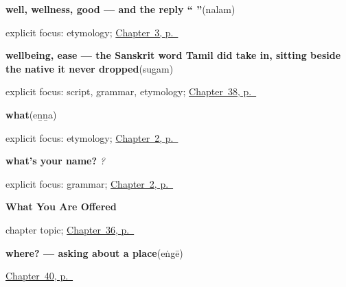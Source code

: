 \noindent\begin{minipage}[t]{\linewidth}
\raggedright
\textbf{well, wellness, good — and the reply \textquotedblleft{}  \textquotedblright{}}\enspace\emph{}\enspace(nalam)\par
\footnotesize explicit focus: etymology; \hyperref[ch:responding]{Chapter~3, p.~\pageref*{ch:responding}}
\end{minipage}\par\smallskip

\noindent\begin{minipage}[t]{\linewidth}
\raggedright
\textbf{wellbeing, ease — the Sanskrit word Tamil did take in, sitting beside the native  it never dropped}\enspace\emph{}\enspace(sugam)\par
\footnotesize explicit focus: script, grammar, etymology; \hyperref[ch:ta-keeping-well-and-leaving]{Chapter~38, p.~\pageref*{ch:ta-keeping-well-and-leaving}}
\end{minipage}\par\smallskip

\noindent\begin{minipage}[t]{\linewidth}
\raggedright
\textbf{what}\enspace\emph{}\enspace(eṉṉa)\par
\footnotesize explicit focus: etymology; \hyperref[ch:introductions]{Chapter~2, p.~\pageref*{ch:introductions}}
\end{minipage}\par\smallskip

\noindent\begin{minipage}[t]{\linewidth}
\raggedright
\textbf{what's your name?}\enspace\emph{  ?}\par
\footnotesize explicit focus: grammar; \hyperref[ch:introductions]{Chapter~2, p.~\pageref*{ch:introductions}}
\end{minipage}\par\smallskip

\noindent\begin{minipage}[t]{\linewidth}
\raggedright
\textbf{What You Are Offered}\par
\footnotesize chapter topic; \hyperref[ch:ta-what-you-are-offered]{Chapter~36, p.~\pageref*{ch:ta-what-you-are-offered}}
\end{minipage}\par\smallskip

\noindent\begin{minipage}[t]{\linewidth}
\raggedright
\textbf{where? — asking about a place}\enspace\emph{}\enspace(eṅgē)\par
\footnotesize \hyperref[ch:ta-pointing-and-asking]{Chapter~40, p.~\pageref*{ch:ta-pointing-and-asking}}
\end{minipage}\par\smallskip

